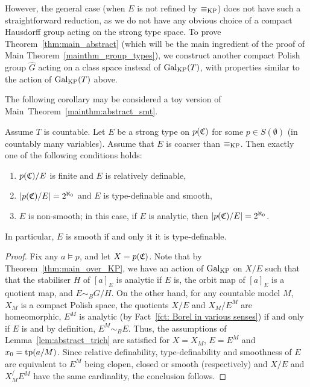 	However, the general case (when $E$ is not refined by $\equiv_{\mathrm{KP}}$) does not have such a straightforward reduction, as we do not have any obvious choice of a compact Hausdorff group acting on the strong type space. To prove Theorem~\ref{thm:main_abstract} (which will be the main ingredient of the proof of Main Theorem~\ref{mainthm_group_types}), we construct another compact Polish group $\hat G$ acting on a class space instead of $\operatorname{{Gal}}_{\mathrm{KP}}(T)$, with properties similar to the action of $\operatorname{{Gal}}_{\mathrm{KP}}(T)$ above.
	
	
	
	The following corollary may be considered a toy version of Main~Theorem~\ref{mainthm:abstract_smt}.
	
	\begin{cor}
		\label{cor:main_over_KP}
		Assume $T$ is countable. Let $E$ be a strong type on $p({\mathfrak C})$ for some $p\in S(\emptyset)$ (in countably many variables). Assume that $E$ is coarser than $\equiv_{\mathrm{KP}}$. Then exactly one of the following conditions holds:
		\begin{enumerate}
			\item
			$p({\mathfrak C})/E$ is finite and $E$ is relatively definable,
			\item
			$|p({\mathfrak C})/E|=2^{\aleph_0}$ and $E$ is type-definable and smooth,
			\item
			$E$ is non-smooth; in this case, if $E$ is analytic, then $|p({\mathfrak C})/E|=2^{\aleph_0}$.
		\end{enumerate}
		In particular, $E$ is smooth if and only it it is type-definable.
	\end{cor}
	\begin{proof}
		Fix any $a\models p$, and let $X=p({\mathfrak C})$. Note that by Theorem~\ref{thm:main_over_KP}, we have an action of $\operatorname{{Gal}}_{\mathrm{KP}}$ on $X/E$ such that that the stabiliser $H$ of $[a]_E$ is analytic if $E$ is, the orbit map of $[a]_E$ is a quotient map, and $E\sim_B G/H$. On the other hand, for any countable model $M$, $X_M$ is a compact Polish space, the quotients $X/E$ and $X_M/E^M$ are homeomorphic, $E^M$ is analytic (by Fact~\ref{fct: Borel in various senses}) if and only if $E$ is and by definition, $E^M\sim_B E$. Thus, the assumptions of Lemma~\ref{lem:abstract_trich} are satisfied for $X=X_M$, $E=E^M$ and $x_0=\operatorname{{tp}}(a/M)$. Since relative definability, type-definability and smoothness of $E$ are equivalent to $E^M$ being clopen, closed or smooth (respectively) and $X/E$ and $X_M^/E^M$ have the same cardinality, the conclusion follows.
	\end{proof}
	
